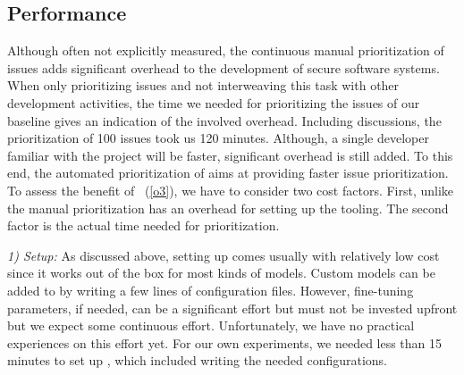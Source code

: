 %
%


\subsection{Performance}
%
	Although often not explicitly measured, the continuous manual prioritization of issues adds significant overhead to the development of secure software systems.
	When only prioritizing issues and not interweaving this task with other development activities, the time we needed for prioritizing the issues of our baseline gives an indication of the involved overhead.
	Including discussions, the prioritization of 100 issues took us 120 minutes.
	Although, a single developer familiar with the project will be faster, significant overhead is still added.
	To this end, the automated prioritization of \appr{} aims at providing faster issue prioritization.
	To assess the benefit of \appr{}~(\ref{o3}), we have to consider two cost factors.
	First, unlike the manual prioritization \appr{} has an overhead for setting up the tooling.
	The second factor is the actual time needed for prioritization.




	\textit{1) Setup:}
	As discussed above, setting up \appr{} comes usually with relatively low cost since it works out of the box for most kinds of models.
	Custom models can be added to \appr{} by writing a few lines of configuration files.
	However, fine-tuning parameters, if needed, can be a significant effort but must not be invested upfront but we expect some continuous effort.
	Unfortunately, we have no practical experiences on this effort yet.
	For our own experiments, we needed less than 15 minutes to set up \appr{}, which included writing the needed configurations.


